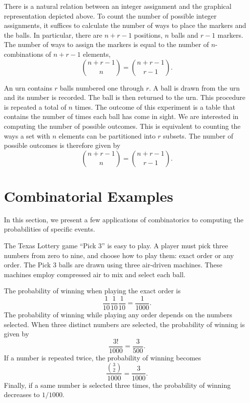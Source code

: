 There is a natural relation between an integer assignment and the graphical representation depicted above.
To count the number of possible integer assignments, it suffices to calculate the number of ways to place the markers and the balls.
In particular, there are $n + r - 1$ positions, $n$ balls and $r - 1$ markers.
The number of ways to assign the markers is equal to the number of $n$-combinations of $n + r - 1$ elements,
\begin{equation*}
\binom{n + r - 1}{n} = \binom{n + r - 1}{r - 1} .
\end{equation*}

\begin{example}
An urn contains $r$ balls numbered one through $r$.
A ball is drawn from the urn and its number is recorded.
The ball is then returned to the urn.
This procedure is repeated a total of $n$ times.
The outcome of this experiment is a table that contains the number of times each ball has come in sight.
We are interested in computing the number of possible outcomes.
This is equivalent to counting the ways a set with $n$ elements can be partitioned into $r$ subsets.
The number of possible outcomes is therefore given by
\begin{equation*}
\binom{n + r - 1}{n} = \binom{n + r - 1}{r - 1} .
\end{equation*}
\end{example}


\section{Combinatorial Examples}

In this section, we present a few applications of combinatorics to computing the probabilities of specific events.

\begin{example}
The Texas Lottery game ``Pick $3$'' is easy to play.
A player must pick three numbers from zero to nine, and choose how to play them: exact order or any order.
The Pick $3$ balls are drawn using three air-driven machines.
These machines employ compressed air to mix and select each ball.

The probability of winning when playing the exact order is
\begin{equation*}
\frac{1}{10} \frac{1}{10} \frac{1}{10}
= \frac{1}{1000} .
\end{equation*}
The probability of winning while playing any order depends on the numbers selected.
When three distinct numbers are selected, the probability of winning is given by
\begin{equation*}
\frac{3!}{1000} = \frac{3}{500} .
\end{equation*}
If a number is repeated twice, the probability of winning becomes
\begin{equation*}
\frac{\binom{3}{2}}{1000} = \frac{3}{1000} .
\end{equation*}
Finally, if a same number is selected three times, the probability of winning decreases to $1/1000$.
\end{example}

